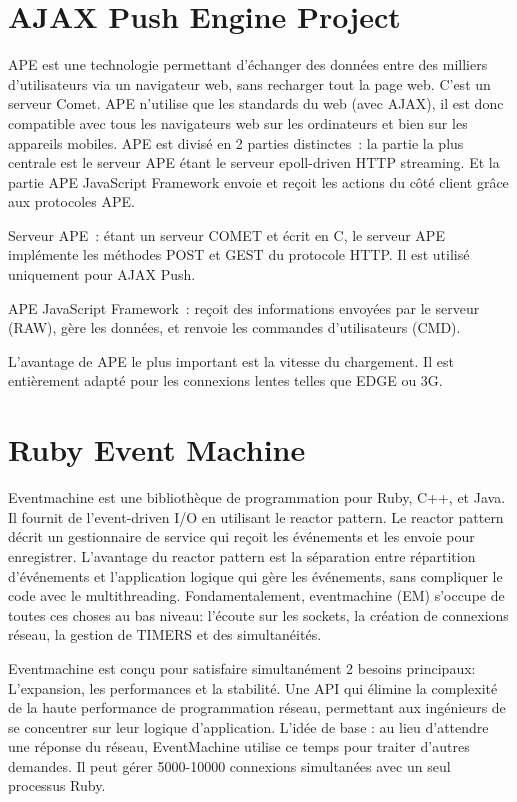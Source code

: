 \documentclass[a4paper,10pt]{report}
\begin{document}
  \section{AJAX Push Engine Project}
  
APE est une technologie permettant d'échanger des données entre des milliers d'utilisateurs via un navigateur web, sans recharger tout la page web. C'est un serveur Comet. APE n’utilise que les standards du web (avec AJAX), il est donc compatible avec tous les navigateurs web sur les ordinateurs et bien sur les appareils mobiles.
APE est divisé en 2 parties distinctes : la partie la plus centrale est le serveur APE  étant le serveur epoll-driven HTTP streaming. Et la partie APE JavaScript Framework envoie et reçoit les actions du côté client grâce aux protocoles APE.

Serveur APE : étant un serveur COMET et écrit en C, le serveur APE implémente les méthodes POST et GEST du protocole HTTP. Il est utilisé uniquement pour AJAX Push.

APE JavaScript Framework : reçoit des informations envoyées par le serveur (RAW), gère les données, et renvoie les commandes d’utilisateurs (CMD).

L’avantage de APE le plus important est la vitesse du chargement. Il est entièrement adapté pour les connexions lentes telles que EDGE ou 3G.

  \section{Ruby Event Machine}
  
Eventmachine est une bibliothèque de programmation pour Ruby, C++, et Java. Il fournit de l'event-driven I/O en utilisant le reactor pattern.  Le reactor pattern décrit un gestionnaire de service qui reçoit les événements et les envoie pour enregistrer. L’avantage du reactor pattern est la séparation entre répartition d’événements et l’application logique qui gère les événements, sans compliquer le code avec le multithreading.
Fondamentalement, eventmachine (EM) s'occupe de toutes ces choses au bas niveau: l'écoute sur les sockets, la création de connexions réseau, la gestion de TIMERS et des simultanéités. 

Eventmachine est conçu pour satisfaire simultanément 2 besoins principaux:
L’expansion, les performances et la stabilité. 
Une API qui élimine la complexité de la haute performance de programmation réseau, permettant aux ingénieurs de se concentrer sur leur logique d'application.
L'idée de base : au lieu d'attendre une réponse du réseau, EventMachine utilise ce temps pour traiter d'autres demandes. Il peut gérer 5000-10000 connexions simultanées avec un seul processus Ruby. 
\end{document}
